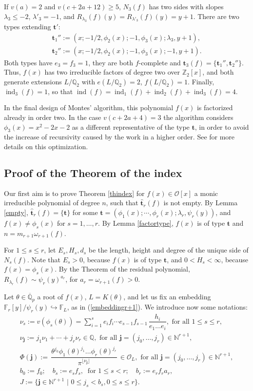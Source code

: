 \documentclass{amsart}
\newcommand{\N}{\mathbb N}
\newcommand{\Z}{\mathbb Z}
\newcommand{\Q}{\mathbb Q}
\def\op{\operatorname}
\def\as#1{\renewcommand\arraystretch{#1}}
\def\ff#1{\mathbb{F}_{#1}}
\def\ind{\op{ind}}
\def\j{\mathbf{j}}
\def\la{\lambda}
\def\ol{{\mathcal O}_L}
\def\om{\omega}
\def\oo{{\mathcal O}}
\def\qpb{\overline{\mathbb{Q}}_p}
\def\t{\theta}
\def\tt{\hat{\mathbf{t}}}
\def\ty{\mathbf{t}}
\def\tq{\,\,|\,\,}
\def\zpx{\oo[x]}
\begin{document}
If $v(a)=2$ and $v(c+2a+12)\ge5$, $N_3(f)$ has two sides with slopes $\la_3\le-2$, $\la'_3=-1$, and $R_{\la_3}(f)(y)=R_{\la'_3}(f)(y)=y+1$. There are two types extending $\ty'$:
$$
\begin{array}{l}
\ty_1'':=(x;-1/2,\phi_2(x);-1,\phi_3(x);\la_3,y+1),\\ 
\ty_2'':=(x;-1/2,\phi_2(x);-1,\phi_3(x);-1,y+1).
\end{array}
$$Both types have $e_3=f_3=1$, they are both $f$-complete and $\ty_3(f)=\{\ty_1'',\ty_2''\}$. Thus, $f(x)$ has two irreducible factors of degree two over $\Z_2[x]$, and both generate extensions $L/\Q_2$ with $e(L/\Q_2)=2$, $f(L/\Q_2)=1$. Finally, $\ind_3(f)=1$, so that $\ind(f)=\ind_1(f)+\ind_2(f)+\ind_3(f)=4$.

In the final design of Montes' algorithm, this polynomial $f(x)$ is factorized already in order two. In the case $v(c+2a+4)=3$ the algorithm considers $\phi_3(x)=x^2-2x-2$ as a different representative of the type $\ty$, in order to avoid the increase of recursivity caused by the work in a higher order. See \cite{gmna} for more details on this optimization.

\subsection{Proof of the Theorem of the index}
Our first aim is to prove Theorem \ref{thindex} for $f(x)\in\zpx$ a monic irreducible polynomial of degree $n$, such that $\tt_r(f)$ is not empty. By Lemma \ref{empty}, $\tt_r(f)=\{\ty\}$ for some $\ty=(\phi_1(x);\cdots,\phi_r(x);\la_r,\psi_r(y))$, and $f(x)\ne\phi_s(x)$ for $s=1,\dots,r$. By Lemma \ref{factortype}, $f(x)$ is of type $\ty$ and $n=m_{r+1}\om_{r+1}(f)$. 

For $1\le s\le r$, let $E_s,H_s,d_s$ be the length, height and degree of the unique side of $N_s(f)$. Note that $E_s>0$, because $f(x)$ is of type $\ty$, and $0<H_s<\infty$, because $f(x)=\phi_s(x)$. By the Theorem of the residual polynomial, $R_{\la_r}(f)\sim \psi_r(y)^{a_r}$, for $a_r=\om_{r+1}(f)>0$.  

Let $\t\in\qpb$ a root of $f(x)$, $L=K(\t)$, and let us fix an embedding $\ff{r}[y]/\psi_r(y)\hookrightarrow \ff{L}$,
as in (\ref{embeddingr+1}). We introduce now some notations:
$$\as{1.8}
\begin{array}{l}
\nu_s:=v(\phi_s(\t))=\sum_{i=1}^se_if_i\cdots e_{s-1}f_{s-1}\,\dfrac{h_i}{e_1\dots e_i}, \mbox{ for all }1\le s\le r,\\
\nu_{\j}:= j_1\nu_1+\cdots+j_r\nu_r\in\Q, \mbox{ for all }
\j=(j_0,\dots,j_r)\in\N^{r+1},\\
\Phi(\j):=\,\dfrac{\t^{j_0}\phi_1(\t)^{j_1}\dots\phi_r(\t)^ {j_r}}{\pi^{\lfloor \nu_{\j}\rfloor}}\,\in\ol, \mbox{ for all }
\j=(j_0,\dots,j_r)\in\N^{r+1},\\
b_0:=f_0;\quad b_s:=e_sf_s,\ \mbox{ for }1\le s<r; \quad b_r:=e_rf_ra_r,\\
J:=\{\j\in\N^{r+1}\tq 0\le j_s<b_s, 0\le s\le r\}.
\end{array}
$$
\end{document}
